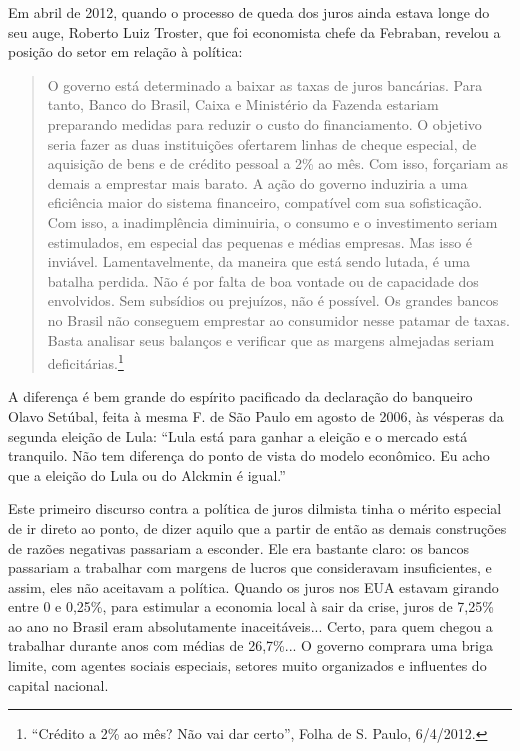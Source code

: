 Em abril de 2012, quando o processo de queda dos juros ainda estava
longe do seu auge, Roberto Luiz Troster, que foi economista chefe da
Febraban, revelou a posição do setor em relação à política:

\begin{quote}
O governo está determinado a baixar as taxas de juros bancárias. Para
tanto, Banco do Brasil, Caixa e Ministério da Fazenda estariam
preparando medidas para reduzir o custo do financiamento. O objetivo
seria fazer as duas instituições ofertarem linhas de cheque especial, de
aquisição de bens e de crédito pessoal a 2\% ao mês. Com isso, forçariam
as demais a emprestar mais barato. A ação do governo induziria a uma
eficiência maior do sistema financeiro, compatível com sua sofisticação.
Com isso, a inadimplência diminuiria, o consumo e o investimento seriam
estimulados, em especial das pequenas e médias empresas. Mas isso é
inviável. Lamentavelmente, da maneira que está sendo lutada, é uma
batalha perdida. Não é por falta de boa vontade ou de capacidade dos
envolvidos. Sem subsídios ou prejuízos, não é possível. Os grandes
bancos no Brasil não conseguem emprestar ao consumidor nesse patamar de
taxas. Basta analisar seus balanços e verificar que as margens almejadas
seriam deficitárias.\footnote{``Crédito a 2\% ao mês? Não vai dar
  certo'', Folha de S. Paulo, 6/4/2012.}
\end{quote} 

A diferença é bem grande do espírito pacificado da declaração do
banqueiro Olavo Setúbal, feita à mesma F. de São Paulo em agosto de
2006, às vésperas da segunda eleição de Lula: ``Lula está para ganhar a
eleição e o mercado está tranquilo. Não tem diferença do ponto de vista
do modelo econômico. Eu acho que a eleição do Lula ou do Alckmin é
igual.''

Este primeiro discurso contra a política de juros dilmista tinha o
mérito especial de ir direto ao ponto, de dizer aquilo que a partir de
então as demais construções de razões negativas passariam a esconder.
Ele era bastante claro: os bancos passariam a trabalhar com margens de
lucros que consideravam insuficientes, e assim, eles não aceitavam a
política. Quando os juros nos EUA estavam girando entre 0 e 0,25\%, para
estimular a economia local à sair da crise, juros de 7,25\% ao ano no
Brasil eram absolutamente inaceitáveis... Certo, para quem chegou a
trabalhar durante anos com médias de 26,7\%... O governo comprara uma
briga limite, com agentes sociais especiais, setores muito organizados e
influentes do capital nacional.

